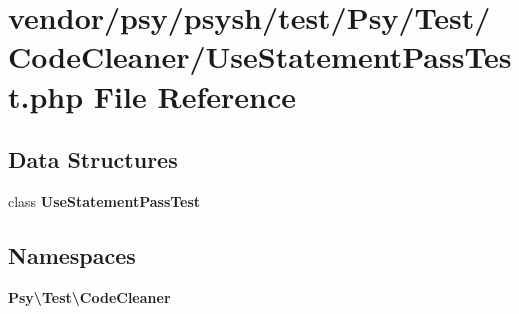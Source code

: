 \section{vendor/psy/psysh/test/\+Psy/\+Test/\+Code\+Cleaner/\+Use\+Statement\+Pass\+Test.php File Reference}
\label{_use_statement_pass_test_8php}
\subsection*{Data Structures}
\begin{DoxyCompactItemize}
\item 
class {\bf Use\+Statement\+Pass\+Test}
\end{DoxyCompactItemize}
\subsection*{Namespaces}
\begin{DoxyCompactItemize}
\item 
 {\bf Psy\textbackslash{}\+Test\textbackslash{}\+Code\+Cleaner}
\end{DoxyCompactItemize}
